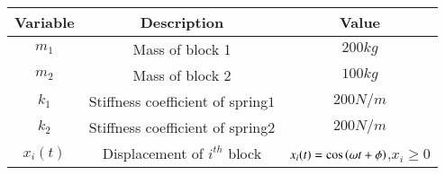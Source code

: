     \begin{tabular}{|c|c|c|} 
    \hline
\textbf{Variable} & \textbf{Description} & \textbf{Value} \\\hline
    $m_1$ & Mass of block 1 & $200kg$  \\\hline
    $m_2$ & Mass of block 2 & $100kg$  \\\hline
    $k_1$ & Stiffness coefficient of spring$1$ & $200N/m$  \\\hline
    $k_2$ & Stiffness coefficient of spring$2$ & $200N/m$  \\\hline
    $x_i(t)$ & Displacement of $i^{th}$ block & $x_i(t)=\cos \left(\omega t +\phi\right)$,$x_i\geq 0$ \\ \hline
        \end{tabular}
    
    
